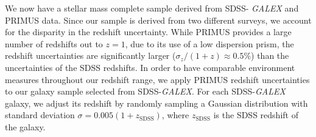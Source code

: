 We now have a stellar mass complete sample derived from SDSS-{\em
  GALEX} and PRIMUS data. Since our sample is derived from two
different surveys, we account for the disparity in the redshift
uncertainty. While PRIMUS provides a large number of redshifts out to
$z = 1$, due to its use of a low dispersion prism, the redshift
uncertainties are significantly larger ($\sigma_{z}/(1+z) \approx 0.5
\%$) than the uncertainties of the SDSS redshifts. In order to have
comparable environment measures throughout our redshift range, we
apply PRIMUS redshift uncertainties to our galaxy sample selected from
SDSS-{\em GALEX}. For each SDSS-{\em GALEX} galaxy, we adjust its
redshift by randomly sampling a Gaussian distribution with standard
deviation $\sigma = 0.005 (1+z_\mathrm{SDSS})$, where
$z_\mathrm{SDSS}$ is the SDSS redshift of the galaxy.

